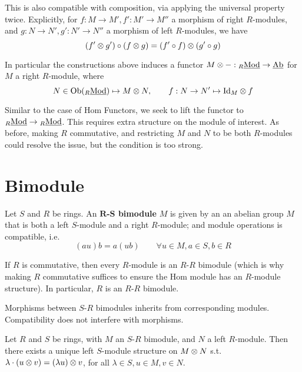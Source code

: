 \begin{remark}
    This is also compatible with composition, via applying the universal property twice. Explicitly, for $f: M \to M', f': M' \to M''$ a morphism of right $R$-modules, and $g: N \to N', g': N' \to N''$ a morphism of left $R$-modules, we have
    \[
        (f' \otimes g') \circ (f \otimes g) = (f' \circ f) \otimes (g' \circ g)
    \]
\end{remark}

\begin{remark}
    In particular the constructions above induces a functor $M \otimes -: {}_{R}\underline{\textup{Mod}} \to \underline{\textup{Ab}}$ for $M$ a right $R$-module, where 
    \[
        N \in \mathrm{Ob}({}_{R}\underline{\textup{Mod}}) \mapsto M \otimes N, \qquad f: N \to N' \mapsto \mathrm{Id}_{M} \otimes f
    \]
\end{remark}

Similar to the case of Hom Functors, we seek to lift the functor to ${}_{R}\underline{\textup{Mod}} \to {}_{R}\underline{\textup{Mod}}$. This requires extra structure on the module of interest. As before, making $R$ commutative, and restricting $M$ and $N$ to be both $R$-modules could resolve the issue, but the condition is too strong.  

\section{Bimodule}

\begin{definition}[Bimodule]
    Let $S$ and $R$ be rings. An \textbf{$\mathbf{R}$-$\mathbf{S}$ bimodule} $M$ is given by an an abelian group $M$ that is both a left $S$-module and a right $R$-module; and module operations is compatible, i.e.
    \[
        (au)b = a(ub) \qquad \forall u \in M, a \in S, b \in R
    \]
\end{definition}

\begin{remark}
    If $R$ is commutative, then every $R$-module is an $R$-$R$ bimodule (which is why making $R$ commutative suffices to ensure the Hom module has an $R$-module structure). In particular, $R$ is an $R$-$R$ bimodule.
\end{remark}

\begin{remark}
    Morphisms between $S$-$R$ bimodules inherits from corresponding modules. Compatibility does not interfere with morphisms.
\end{remark}

\begin{proposition}\label{Prop:Comp of bimodule}
    Let $R$ and $S$ be rings, with $M$ an $S$-$R$ bimodule, and $N$ a left $R$-module. Then there exists a unique left $S$-module structure on $M \otimes N$ s.t. $\lambda\cdot (u \otimes v) = (\lambda u) \otimes v$, for all $\lambda \in S, u\in M, v\in N$.
\end{proposition}

